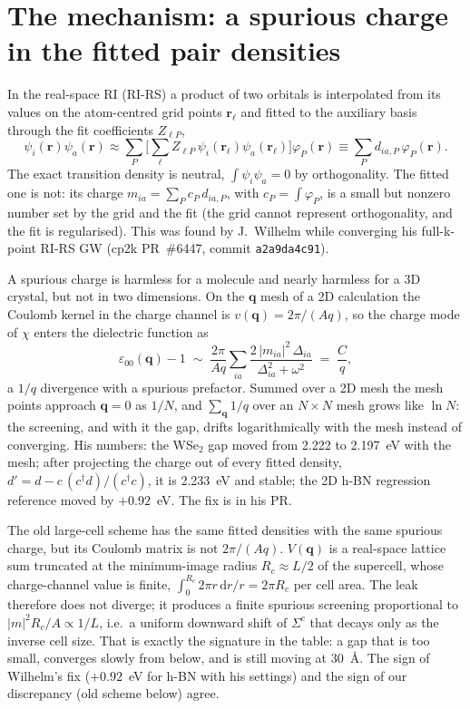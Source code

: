 \documentclass[11pt,a4paper]{article}
\newcommand{\bq}{\mathbf{q}}
\newcommand{\br}{\mathbf{r}}
\begin{document}
\section{The mechanism: a spurious charge in the fitted pair densities}

In the real-space RI (RI-RS) a product of two orbitals is interpolated from its values on the
atom-centred grid points $\br_\ell$ and fitted to the auxiliary basis through the fit
coefficients $Z_{\ell P}$,
\begin{equation}
  \psi_i(\br)\psi_a(\br) \approx \sum_{P}\Big[\sum_\ell Z_{\ell P}\,\psi_i(\br_\ell)\psi_a(\br_\ell)\Big]\varphi_P(\br)
  \equiv \sum_P d_{ia,P}\,\varphi_P(\br).
\end{equation}
The exact transition density is neutral, $\int\psi_i\psi_a = 0$ by orthogonality. The fitted one
is not: its charge $m_{ia} = \sum_P c_P\,d_{ia,P}$, with $c_P = \int\varphi_P$, is a small but
nonzero number set by the grid and the fit (the grid cannot represent orthogonality, and the
fit is regularised). This was found by J.~Wilhelm while converging his full-k-point RI-RS GW
(cp2k PR~\#6447, commit \texttt{a2a9da4c91}).

A spurious charge is harmless for a molecule and nearly harmless for a 3D crystal, but not in
two dimensions. On the $\bq$ mesh of a 2D calculation the Coulomb kernel in the charge channel
is $v(\bq) = 2\pi/(Aq)$, so the charge mode of $\chi$ enters the dielectric function as
\begin{equation}
  \varepsilon_{00}(\bq) - 1 \;\sim\; \frac{2\pi}{Aq}\sum_{ia}\frac{2\,|m_{ia}|^2\,\Delta_{ia}}{\Delta_{ia}^2+\omega^2}
  \;=\; \frac{C}{q},
\end{equation}
a $1/q$ divergence with a spurious prefactor. Summed over a 2D mesh the mesh points approach
$\bq = 0$ as $1/N$, and $\sum_\bq 1/q$ over an $N\times N$ mesh grows like $\ln N$: the
screening, and with it the gap, drifts logarithmically with the mesh instead of converging. His
numbers: the WSe$_2$ gap moved from 2.222 to 2.197~eV with the mesh; after projecting the charge
out of every fitted density, $d' = d - c\,(c^\dagger d)/(c^\dagger c)$, it is 2.233~eV and
stable; the 2D h-BN regression reference moved by $+0.92$~eV. The fix is in his PR.

The old large-cell scheme has the same fitted densities with the same spurious charge, but its
Coulomb matrix is not $2\pi/(Aq)$. $V(\bq)$ is a real-space lattice sum truncated at the
minimum-image radius $R_c \approx L/2$ of the supercell, whose charge-channel value is finite,
$\int_0^{R_c}\!2\pi r\,\mathrm{d}r/r = 2\pi R_c$ per cell area. The leak therefore does not
diverge; it produces a finite spurious screening proportional to $|m|^2 R_c/A \propto 1/L$,
i.e.\ a uniform downward shift of $\Sigma^c$ that decays only as the inverse cell size. That is
exactly the signature in the table: a gap that is too small, converges slowly from below, and
is still moving at 30~\AA. The sign of Wilhelm's fix ($+0.92$~eV for h-BN with his settings) and
the sign of our discrepancy (old scheme below) agree.
\end{document}
